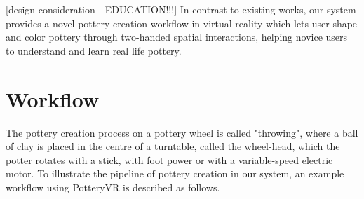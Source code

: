 [design consideration - EDUCATION!!!]
In contrast to existing works, our system provides a novel pottery creation workflow in virtual reality which lets user shape and color pottery through two-handed spatial interactions, helping novice users to understand and learn real life pottery.



\section{Workflow}
\label{sec:3}

The pottery creation process on a pottery wheel is called "throwing", where a ball of clay is placed in the centre of a turntable, called the wheel-head, which the potter rotates with a stick, with foot power or with a variable-speed electric motor.
To illustrate the pipeline of pottery creation in our system, an example workflow using PotteryVR is described as follows.

